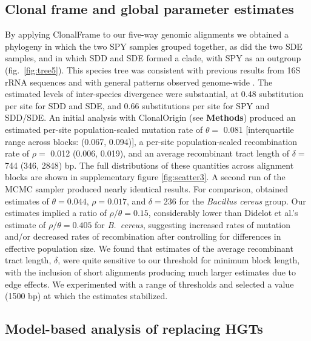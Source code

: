 \documentclass[12pt]{article}
\begin{document}
\subsection*{Clonal frame and global parameter estimates}
By applying ClonalFrame to our five-way genomic alignments
we obtained a phylogeny in which the two SPY
samples grouped together, as did the two SDE samples, and in which SDD and
SDE formed a clade, with SPY as an outgroup (fig.\ \ref{fig:tree5}).  This
species tree was consistent with previous results from 16S rRNA sequences
\citep{Facklam2002} and with general patterns observed genome-wide
\citep{Suzuki2011}.  The estimated levels of inter-species divergence were
substantial, at 0.48 substitution per site for SDD and SDE, and 0.66
substitutions per site for SPY and SDD/SDE.  An initial analysis with
ClonalOrigin (see \textbf{Methods}) produced an estimated per-site
population-scaled mutation rate of $\theta = $ 0.081 [interquartile range
across blocks: (0.067, 0.094)], a per-site population-scaled recombination
rate of $\rho = $ 0.012 (0.006, 0.019), and an average recombinant tract
length of $\delta = $ 744 (346, 2848) bp.  The full distributions of these
quantities across alignment blocks are shown in supplementary figure
\ref{fig:scatter3}.  A second run of the MCMC sampler produced nearly
identical results.  For comparison,
\cite{Didelot2010} obtained estimates of $\theta = 0.044$, $\rho = 0.017$,
and $\delta = 236$ for the {\em Bacillus cereus} group.  Our estimates
implied a ratio of $\rho/\theta = 0.15$, considerably lower than Didelot et
al.'s \citeyearpar{Didelot2010} estimate of $\rho/\theta = 0.405$ for {\em
  B.\ cereus}, suggesting increased rates of mutation and/or decreased
rates of recombination after controlling for differences in effective
population size.  We found that estimates of the average recombinant tract
length, $\delta$, were quite sensitive to our threshold for minimum block
length, with the inclusion of short alignments producing much larger
estimates due to edge effects.  We experimented with a range of thresholds
and selected a value (1500 bp) at which the estimates stabilized.

\subsection*{Model-based analysis of replacing HGTs}
\end{document}
